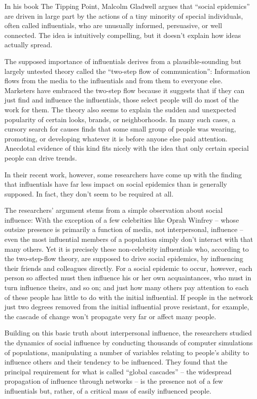 In his book The Tipping Point, Malcolm Gladwell argues that ``social epidemics'' are driven in large part by the actions of a tiny minority of special individuals, often called influentials, who are unusually informed, persuasive, or well connected. The idea is intuitively compelling, but it doesn't explain how ideas actually spread.


The supposed importance of influentials derives from a plausible-sounding but largely untested theory called the ``two-step flow of communication'': Information flows from the media to the influentials and from them to everyone else. Marketers have embraced the two-step flow because it suggests that if they can just find and influence the influentials, those select people will do most of the work for them. The theory also seems to explain the sudden and unexpected popularity of certain looks, brands, or neighborhoods. In many such cases, a cursory search for causes finds that some small group of people was wearing, promoting, or developing whatever it is before anyone else paid attention. Anecdotal evidence of this kind fits nicely with the idea that only certain special people can drive trends.


In their recent work, however, some researchers have come up with the finding that influentials have far less impact on social epidemics than is generally supposed. In fact, they don't seem to be required at all.


The researchers' argument stems from a simple observation about social influence: With the exception of a few celebrities like Oprah Winfrey – whose outsize presence is primarily a function of media, not interpersonal, influence – even the most influential members of a population simply don't interact with that many others. Yet it is precisely these non-celebrity influentials who, according to the two-step-flow theory, are supposed to drive social epidemics, by influencing their friends and colleagues directly. For a social epidemic to occur, however, each person so affected must then influence his or her own acquaintances, who must in turn influence theirs, and so on; and just how many others pay attention to each of these people has little to do with the initial influential. If people in the network just two degrees removed from the initial influential prove resistant, for example, the cascade of change won't propagate very far or affect many people.


Building on this basic truth about interpersonal influence, the researchers studied the dynamics of social influence by conducting thousands of computer simulations of populations, manipulating a number of variables relating to people's ability to influence others and their tendency to be influenced. They found that the principal requirement for what is called ``global cascades'' – the widespread propagation of influence through networks – is the presence not of a few influentials but, rather, of a critical mass of easily influenced people.